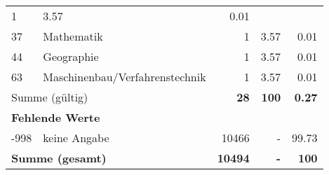\begin{longtable}{lXrrr}
       \num{1} &
       \num[round-mode=places,round-precision=2]{3,57} &
         \num[round-mode=places,round-precision=2]{0,01} \\

     37 &
     \multicolumn{1}{X}{ Mathematik   } &


       \num{1} &
       \num[round-mode=places,round-precision=2]{3,57} &
         \num[round-mode=places,round-precision=2]{0,01} \\

     44 &
     \multicolumn{1}{X}{ Geographie   } &


       \num{1} &
       \num[round-mode=places,round-precision=2]{3,57} &
         \num[round-mode=places,round-precision=2]{0,01} \\

     63 &
     \multicolumn{1}{X}{ Maschinenbau/Verfahrenstechnik   } &


       \num{1} &
       \num[round-mode=places,round-precision=2]{3,57} &
         \num[round-mode=places,round-precision=2]{0,01} \\
     \midrule
     \multicolumn{2}{l}{Summe (gültig)} &
       \textbf{\num{28}} &
     \textbf{100} &
       \textbf{\num[round-mode=places,round-precision=2]{0,27}} \\
     \multicolumn{5}{l}{\textbf{Fehlende Werte}}\\
       -998 &
       keine Angabe &
         \num{10466} &
        - &
         \num[round-mode=places,round-precision=2]{99,73} \\
     \midrule
     \multicolumn{2}{l}{\textbf{Summe (gesamt)}} &
          \textbf{\num{10494}} &
        \textbf{-} &
        \textbf{100} \\
     \bottomrule
     \end{longtable}
     
